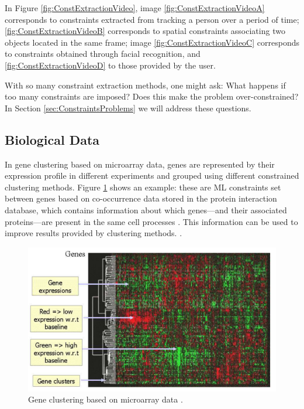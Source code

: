 In Figure \ref{fig:ConstExtractionVideo}, image \ref{fig:ConstExtractionVideoA} corresponds to constraints extracted from tracking a person over a period of time; \ref{fig:ConstExtractionVideoB} corresponds to spatial constraints associating two objects located in the same frame; image \ref{fig:ConstExtractionVideoC} corresponds to constraints obtained through facial recognition, and \ref{fig:ConstExtractionVideoD} to those provided by the user.

With so many constraint extraction methods, one might ask: What happens if too many constraints are imposed? Does this make the problem over-constrained? In Section \ref{sec:ConstraintsProblems} we will address these questions.

\subsection{Biological Data}

In gene clustering based on microarray data, genes are represented by their expression profile in different experiments and grouped using different constrained clustering methods. Figure \ref{fig:GeneticApp} shows an example: these are \acs{ML} constraints set between genes based on co-occurrence data stored in the protein interaction database, which contains information about which genes---and their associated proteins---are present in the same cell processes \cite{xenarios2001dip}. This information can be used to improve results provided by clustering methods. \cite{segal2003discovering}.

\begin{figure}[!h]
	\centering
	\includegraphics[scale=0.3]{gfx/ConstClust/Genetica/Genes} 
	\caption[Gene clustering based on microarray data.]{Gene clustering based on microarray data \cite{davidson2007survey}.}\label{fig:GeneticApp}
\end{figure}

